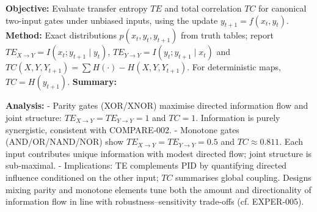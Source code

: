 \textbf{Objective:} Evaluate transfer entropy $TE$ and total correlation $TC$ for canonical two-input gates under unbiased inputs, using the update $y_{t+1}=f(x_t,y_t)$.
\textbf{Method:} Exact distributions $p(x_t,y_t,y_{t+1})$ from truth tables; report $TE_{X\to Y}=I(x_t;y_{t+1}\mid y_t)$, $TE_{Y\to Y}=I(y_t;y_{t+1}\mid x_t)$ and $TC(X,Y,Y_{t+1})=\sum H(\cdot)-H(X,Y,Y_{t+1})$. For deterministic maps, $TC=H(y_{t+1})$.
\textbf{Summary:}
\begin{center}
\end{center}
\textbf{Analysis:}
- Parity gates (XOR/XNOR) maximise directed information flow and joint structure: $TE_{X\to Y}=TE_{Y\to Y}=1$ and $TC=1$. Information is purely synergistic, consistent with COMPARE‑002.
- Monotone gates (AND/OR/NAND/NOR) show $TE_{X\to Y}=TE_{Y\to Y}=0.5$ and $TC\approx0.811$. Each input contributes unique information with modest directed flow; joint structure is sub‑maximal.
- Implications: TE complements PID by quantifying directed influence conditioned on the other input; $TC$ summarises global coupling. Designs mixing parity and monotone elements tune both the amount and directionality of information flow in line with robustness–sensitivity trade‑offs (cf. EXPER‑005).


